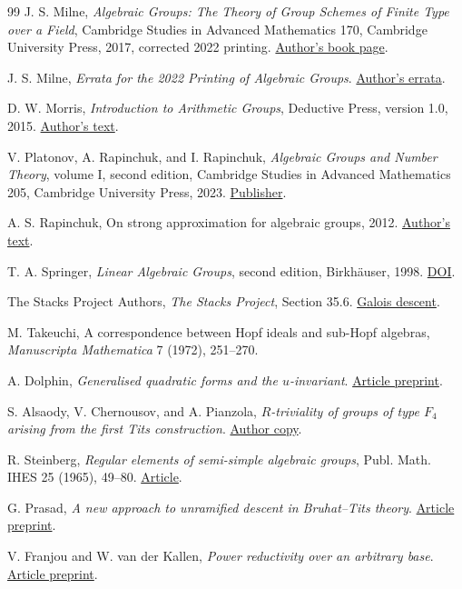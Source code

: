 \documentclass[11pt,a4paper,openany,oneside]{book}
\theoremstyle{resultstyle}
\theoremstyle{definition}
\numberwithin{equation}{chapter}
\begin{document}
{\begin{thebibliography}{99}
J. S. Milne, \emph{Algebraic Groups: The Theory of Group Schemes of Finite Type over a Field},
Cambridge Studies in Advanced Mathematics 170, Cambridge University Press, 2017,
corrected 2022 printing. \href{https://www.jmilne.org/math/Books/iag.html}{Author's book page}.

J. S. Milne, \emph{Errata for the 2022 Printing of Algebraic Groups}.
\href{https://www.jmilne.org/math/Books/iagerrata2022.html}{Author's errata}.

D. W. Morris, \emph{Introduction to Arithmetic Groups},
Deductive Press, version 1.0, 2015.
\href{https://arxiv.org/abs/math/0106063v6}{Author's text}.

V. Platonov, A. Rapinchuk, and I. Rapinchuk,
\emph{Algebraic Groups and Number Theory}, volume I, second edition,
Cambridge Studies in Advanced Mathematics 205, Cambridge University Press, 2023.
\href{https://www.cambridge.org/core/books/algebraic-groups-and-number-theory/DCBB6BE68D2326C60EFEE9C9B5CD176B}{Publisher}.

A. S. Rapinchuk, On strong approximation for algebraic groups, 2012.
\href{https://arxiv.org/abs/1207.4425v1}{Author's text}.

T. A. Springer, \emph{Linear Algebraic Groups}, second edition,
Birkhäuser, 1998. \href{https://doi.org/10.1007/978-0-8176-4840-4}{DOI}.

The Stacks Project Authors, \emph{The Stacks Project},
Section 35.6. \href{https://stacks.math.columbia.edu/tag/0CDQ}{Galois descent}.

M. Takeuchi, A correspondence between Hopf ideals and sub-Hopf algebras,
\emph{Manuscripta Mathematica} 7 (1972), 251--270.


A. Dolphin, \emph{Generalised quadratic forms and the \(u\)-invariant}.
\href{https://arxiv.org/abs/1610.06915v2}{Article preprint}.

S. Alsaody, V. Chernousov, and A. Pianzola,
\emph{\(R\)-triviality of groups of type \(F_4\) arising from the first Tits construction}.
\href{https://www.math.ualberta.ca/~chernous/ChernousovPublications/F4arxiv.pdf}{Author copy}.

R. Steinberg, \emph{Regular elements of semi-simple algebraic groups},
Publ. Math. IHES 25 (1965), 49--80.
\href{https://www.numdam.org/item/PMIHES_1965__25__49_0/}{Article}.

G. Prasad, \emph{A new approach to unramified descent in Bruhat--Tits theory}.
\href{https://arxiv.org/abs/1611.07430v7}{Article preprint}.

V. Franjou and W. van der Kallen, \emph{Power reductivity over an arbitrary base}.
\href{https://arxiv.org/abs/0806.0787v2}{Article preprint}.

\end{thebibliography}
\par}
\end{document}
